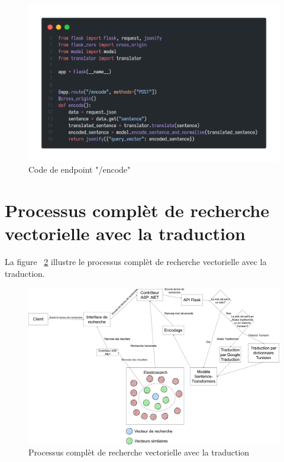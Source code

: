 \begin{figure}[H]
	\centering
	\includegraphics[width=1\textwidth]{logos/encodeendpoint.png}
	\caption{Code de endpoint "/encode"}
	\label{fig:encodeendpoint}
\end{figure}

\newpage
\noindent
\section{Processus complèt de recherche vectorielle avec la traduction}
\noindent
La figure ~\ref{fig:fullprocesswithtranslation} illustre le processus complèt de recherche vectorielle avec la traduction.

\begin{figure}[H]
	\includegraphics[width=1\textwidth]{logos/fullprocesswithtranslation.png}
	\caption{Processus complèt de recherche vectorielle avec la traduction}
	\label{fig:fullprocesswithtranslation}
\end{figure}

